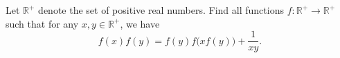 Let $\mathbb{R}^+$ denote the set of positive real numbers. Find all functions $f:\mathbb{R}^+\to\mathbb{R}^+$ such that for any $x,y\in\mathbb{R}^+$, we have \[ f(x)f(y)=f(y)f\Big(xf(y)\Big)+\frac{1}{xy}.\]